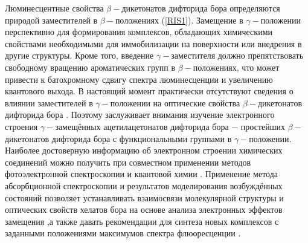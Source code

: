 Люминесцентные свойства $\beta-$дикетонатов дифторида бора определяются природой заместителей в $\beta-$положениях
(\ref{RIS1}). Замещение в $\gamma-$положении перспективно для формирования комплексов, обладающих химическими 
свойствами необходимыми для иммобилизации на поверхности или внедрения в другие структуры. Кроме того, введение
$\gamma-$заместителя должно препятствовать свободному вращению ароматических групп в $\beta-$положениях, что 
может привести к батохромному сдвигу спектра люминесценции и увеличению квантового выхода.
В настоящий момент практически отсутствуют сведения о влиянии заместителей в $\gamma-$положении на оптические 
свойства $\beta-$дикетонатов дифторида бора \cite{svistunova2008alpha,tikhonov2018electronic}.
Поэтому заслуживает внимания изучение электронного строения $\gamma-$замещённых ацетилацетонатов дифторида бора 
$-$ простейших $\beta-$дикетонатов дифторида бора с функциональными группами в $\gamma-$положении.
Наиболее достоверную информацию об электронном строении химических соединений можно получить при совместном 
применении методов фотоэлектронной спектроскопии и квантовой химии \cite{nefedov1987elektronnaa,
nefedov1989elektronnaa,osmushko2016application}.
Применение метода абсорбционной спектроскопии и результатов моделирования возбуждённых состояний позволяет
устанавливать взаимосвязи молекулярной структуры и оптических свойств хелатов бора на основе анализа электронных
эффектов замещения \cite{karasev2006fotofizika,kazachek2015excited,margar2016fluorescent},а также давать
рекомендации для синтеза новых комплексов с заданными положениями максимумов спектра флюоресценции
\cite{ponce2018searching}.\\


\newcommand{\actuality}{}
\newcommand{\progress}{}
\newcommand{\aim}{{\textbf\aimTXT}}
\newcommand{\tasks}{\textbf{\tasksTXT}}
\newcommand{\novelty}{\textbf{\noveltyTXT}}
\newcommand{\influence}{\textbf{\influenceTXT}}
\newcommand{\methods}{\textbf{\methodsTXT}}
\newcommand{\defpositions}{\textbf{\defpositionsTXT}}
\newcommand{\reliability}{\textbf{\reliabilityTXT}}
\newcommand{\probation}{\textbf{\probationTXT}}
\newcommand{\contribution}{\textbf{\contributionTXT}}
\newcommand{\publications}{\textbf{\publicationsTXT}}


